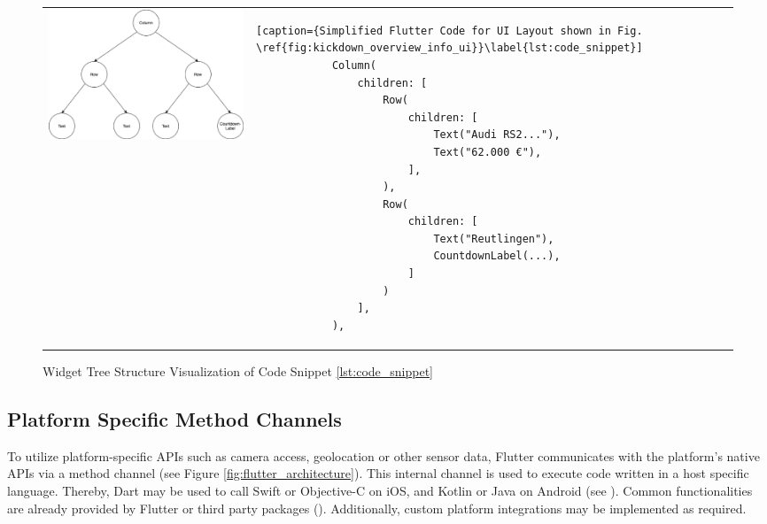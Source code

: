 \begin{figure}[htbp]
    \begin{tabular}{p{}p{}}
        \begin{minipage}{.5\textwidth}
        \centering
        \includegraphics[width=\linewidth]{images/Kickdown_overview_info_ui_tree.eps}
        \caption{Widget Tree Structure Visualization of Code Snippet \ref{lst:code_snippet}}
        \label{fig:kickdown_overview_info_ui_tree}
        \end{minipage}
        &
        \begin{minipage}{.5\textwidth}
            \begin{lstlisting}[caption={Simplified Flutter Code for UI Layout shown in Fig. \ref{fig:kickdown_overview_info_ui}}\label{lst:code_snippet}]
            Column(
                children: [
                    Row(
                        children: [
                            Text("Audi RS2..."),
                            Text("62.000 €"),
                        ],
                    ),
                    Row(
                        children: [
                            Text("Reutlingen"),
                            CountdownLabel(...),
                        ]
                    )
                ],
            ),
            \end{lstlisting}
    \end{minipage}
    \end{tabular}
    \end{figure}

\subsection{Platform Specific Method Channels} \label{subsection::method_channels}
To utilize platform-specific APIs such as camera access, geolocation or other sensor data, Flutter communicates with the platform's native APIs via 
a method channel (see Figure \ref{fig:flutter_architecture}). 
This internal channel is used to execute code written in a host specific language. Thereby, Dart may be used to call Swift or Objective-C on iOS, and Kotlin or Java on Android (see \cite{PlatformChannel2021}).
Common functionalities are already provided by Flutter or third party packages (\cite{PubDev2021}). Additionally, custom platform integrations may be 
implemented as required.


